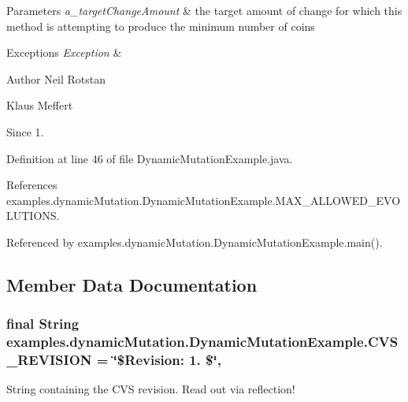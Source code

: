 \begin{DoxyParams}{Parameters}
{\em a\-\_\-target\-Change\-Amount} & the target amount of change for which this method is attempting to produce the minimum number of coins \\
\hline
\end{DoxyParams}

\begin{DoxyExceptions}{Exceptions}
{\em Exception} & \\
\hline
\end{DoxyExceptions}
\begin{DoxyAuthor}{Author}
Neil Rotstan 

Klaus Meffert 
\end{DoxyAuthor}
\begin{DoxySince}{Since}
1. 
\end{DoxySince}


Definition at line 46 of file Dynamic\-Mutation\-Example.\-java.



References examples.\-dynamic\-Mutation.\-Dynamic\-Mutation\-Example.\-M\-A\-X\-\_\-\-A\-L\-L\-O\-W\-E\-D\-\_\-\-E\-V\-O\-L\-U\-T\-I\-O\-N\-S.



Referenced by examples.\-dynamic\-Mutation.\-Dynamic\-Mutation\-Example.\-main().



\subsection{Member Data Documentation}
\hypertarget{classexamples_1_1dynamic_mutation_1_1_dynamic_mutation_example_a40796ee64883e52b1a35c819fd8a867c}{
\subsubsection[{C\-V\-S\-\_\-\-R\-E\-V\-I\-S\-I\-O\-N}]{\setlength{\rightskip}{0pt plus 5cm}final String examples.\-dynamic\-Mutation.\-Dynamic\-Mutation\-Example.\-C\-V\-S\-\_\-\-R\-E\-V\-I\-S\-I\-O\-N = \char`\"{}\$Revision\-: 1. \$\char`\"{}\hspace{0.3cm}{\ttfamily [static]}, {\ttfamily [private]}}}\label{classexamples_1_1dynamic_mutation_1_1_dynamic_mutation_example_a40796ee64883e52b1a35c819fd8a867c}
String containing the C\-V\-S revision. Read out via reflection! 

